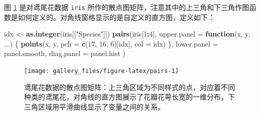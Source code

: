\documentclass[
  b5paper,
  UTF8,twoside]{book}
\newenvironment{Shaded}{\begin{snugshade}}{\end{snugshade}}
\newcommand{\AttributeTok}[1]{\textcolor[rgb]{0.13,0.29,0.53}{#1}}
\newcommand{\CommentTok}[1]{\textcolor[rgb]{0.56,0.35,0.01}{\textit{#1}}}
\newcommand{\ConstantTok}[1]{\textcolor[rgb]{0.56,0.35,0.01}{#1}}
\newcommand{\ControlFlowTok}[1]{\textcolor[rgb]{0.13,0.29,0.53}{\textbf{#1}}}
\newcommand{\DecValTok}[1]{\textcolor[rgb]{0.00,0.00,0.81}{#1}}
\newcommand{\FunctionTok}[1]{\textcolor[rgb]{0.13,0.29,0.53}{\textbf{#1}}}
\newcommand{\NormalTok}[1]{#1}
\newcommand{\OtherTok}[1]{\textcolor[rgb]{0.56,0.35,0.01}{#1}}
\newcommand{\SpecialCharTok}[1]{\textcolor[rgb]{0.81,0.36,0.00}{\textbf{#1}}}
\newcommand{\StringTok}[1]{\textcolor[rgb]{0.31,0.60,0.02}{#1}}
\begin{document}
图 \ref{fig:pairs}
是对鸢尾花数据 \texttt{iris} 所作的散点图矩阵，注意其中的上三角和下三角作图函数是如何定义的。对角线窗格显示的是自定义的直方图，定义如下：

\begin{Shaded}
\end{Shaded}





\begin{Shaded}
\begin{Highlighting}[]
\NormalTok{idx }\OtherTok{\textless{}{-}} \FunctionTok{as.integer}\NormalTok{(iris[[}\StringTok{"Species"}\NormalTok{]])}
\FunctionTok{pairs}\NormalTok{(iris[}\DecValTok{1}\SpecialCharTok{:}\DecValTok{4}\NormalTok{],}
  \AttributeTok{upper.panel =} \ControlFlowTok{function}\NormalTok{(x, y, ...) \{}
    \FunctionTok{points}\NormalTok{(x, y, }\AttributeTok{pch =} \FunctionTok{c}\NormalTok{(}\DecValTok{17}\NormalTok{, }\DecValTok{16}\NormalTok{, }\DecValTok{6}\NormalTok{)[idx], }\AttributeTok{col =}\NormalTok{ idx)}
\NormalTok{  \},}
  \AttributeTok{lower.panel =}\NormalTok{ panel.smooth, }\AttributeTok{diag.panel =}\NormalTok{ panel.hist}
\NormalTok{)}
\end{Highlighting}
\end{Shaded}

\begin{figure}

{\centering \texttt{[image: gallery\_files/figure-latex/pairs-1]} 

}

\caption[鸢尾花数据的散点图矩阵]{鸢尾花数据的散点图矩阵：上三角区域为不同样式的点，对应着不同种类的鸢尾花，对角线的直方图展示了花瓣花萼长宽的一维分布，下三角区域用平滑曲线显示了变量之间的关系。}\label{fig:pairs}
\end{figure}
\end{document}
